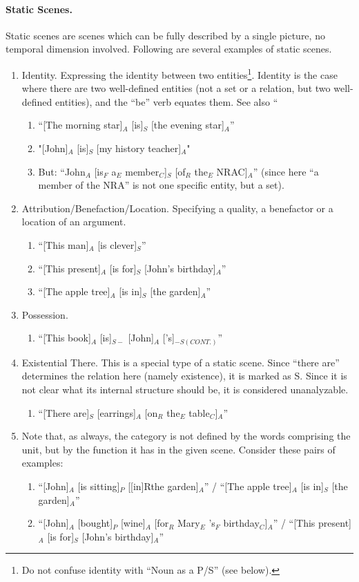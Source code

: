 \documentclass[11pt]{article}
\newcommand{\be}{\begin{enumerate}}
\newcommand{\ee}{\end{enumerate}}
\begin{document}
\paragraph{Static Scenes.} Static scenes are scenes which can be fully described by a single picture, no temporal dimension involved. Following are several examples of static scenes.
\be
\item
Identity. Expressing the identity between two entities\footnote{Do not confuse identity with ``Noun as a P/S'' (see below).}. Identity is the case where there are two well-defined entities (not a set or a relation, but two well-defined entities), and the ``be'' verb equates them. See also ``
\be
\item
``[The morning star]$_A$ [is]$_S$ [the evening star]$_A$''
\item
"[John]$_A$ [is]$_S$ [my history teacher]$_A$"
\item
But: ``John$_A$ [is$_F$ a$_E$ member$_C$]$_S$ [of$_R$ the$_E$ NRAC]$_A$'' (since here ``a member of the NRA'' is not one specific entity, but a set).
\ee

\item
Attribution/Benefaction/Location. Specifying a quality, a benefactor or a location of an argument.
\be
\item
``[This man]$_A$ [is clever]$_S$''
\item
``[This present]$_A$ [is for]$_S$ [John's birthday]$_A$''
\item
``[The apple tree]$_A$ [is in]$_S$ [the garden]$_A$''
\ee

\item
Possession.
\be
\item
``[This book]$_A$ [is]$_{S-}$ [John]$_A$ ['s]$_{-S(CONT.)}$''
\ee
\item
Existential There. This is a special type of a static scene. Since ``there are'' determines the relation here (namely existence), it is marked as S. Since it is not clear what its internal structure should be, it is considered unanalyzable.
\be
\item
``[There are]$_S$ [earrings]$_A$ [on$_R$ the$_E$ table$_C$]$_A$''
\ee

\item
Note that, as always, the category is not defined by the words comprising the unit, but by the function it has in the given scene. Consider these pairs of examples:
\be
\item
``[John]$_A$ [is sitting]$_P$ [[in]Rthe garden]$_A$'' / ``[The apple tree]$_A$ [is in]$_S$ [the garden]$_A$''
\item
``[John]$_A$ [bought]$_P$ [wine]$_A$ [for$_R$ Mary$_E$ 's$_F$ birthday$_C$]$_A$'' / ``[This present]$_A$ [is for]$_S$ [John's birthday]$_A$''
\ee
\ee
\end{document}
